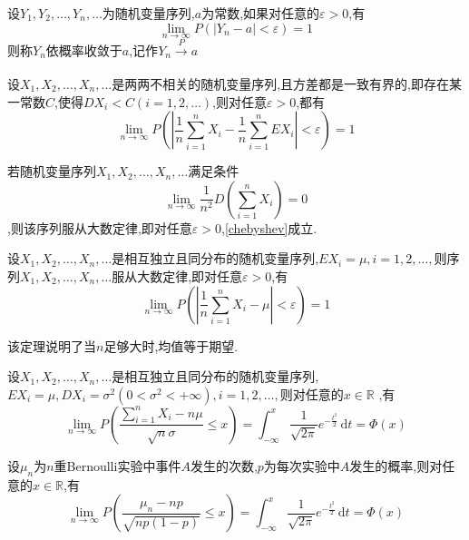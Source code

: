 \begin{definition}
    设$Y_1,Y_2,\dots,Y_n,\dots$为随机变量序列,$a$为常数,如果对任意的$\varepsilon >0$,有\[
     \lim_{n \to \infty}P(\left\lvert Y_n-a \right\rvert< \varepsilon )=1 \]则称${{Y_n}}$依概率收敛于$a$,记作$Y_n\xrightarrow[]{P} a$
\end{definition}
\begin{theorem}[Chebyshev大数定律]
    设$X_1,X_2,\dots,X_n,\dots$是两两不相关的随机变量序列,且方差都是一致有界的,即存在某一常数$C$,使得$DX_i<C(i=1,2,\dots)$,则对任意$\varepsilon >0$,都有
\begin{equation*}
    \label{chebyshev}
        \lim_{n \to \infty}P\left(\left\lvert \frac{1}{n}\sum^{n}_{i=1}X_i-\frac{1}{n}\sum^{n}_{i=1}EX_i \right\rvert< \varepsilon \right)=1
\end{equation*}
\end{theorem}
\begin{theorem}[Markov大数定律]
    若随机变量序列$X_1,X_2,\dots,X_n,\dots$满足条件\[\lim_{n \to \infty}\frac{1}{n^2}D\left(\sum^{n}_{i=1}X_i\right)=0\],则该序列服从大数定律,即对任意$\varepsilon >0$,\eqref{chebyshev}成立.
\end{theorem}
\begin{theorem}[Khinchin大数定律]
    设$X_1,X_2,\dots,X_n,\dots$是相互独立且同分布的随机变量序列,$EX_i=\mu,i=1,2,\dots,$则序列$X_1,X_2,\dots,X_n,\dots$服从大数定律,即对任意$\varepsilon >0$,有
\begin{equation*}
        \lim_{n \to \infty}P\left(\left\lvert \frac{1}{n}\sum^{n}_{i=1}X_i-\mu \right\rvert< \varepsilon \right)=1
\end{equation*}
\end{theorem}
该定理说明了当$n$足够大时,均值等于期望.

\begin{theorem}
    设$X_1,X_2,\dots,X_n,\dots$是相互独立且同分布的随机变量序列,$EX_i=\mu,DX_i=\sigma^2(0<\sigma^2<+\infty),i=1,2,\dots,$则对任意的$x\in \mathbb{R}$ ,有
\begin{equation*}
        \lim_{n \to \infty}P\left(\frac{\sum\limits^{n}_{i=1}X_i-n\mu}{\sqrt{n}\sigma} \leqslant x \right)=\int_{-\infty}^{x}\frac{1}{\sqrt{2\pi}}e^{-\frac{t^2}{2}}  \,\mathrm{d} t =\varPhi (x)
\end{equation*}
\end{theorem}
\begin{theorem}
    设$\mu_n$为$n$重Bernoulli实验中事件$A$发生的次数,$p$为每次实验中$A$发生的概率,则对任意的$x\in \mathbb{R}$,有
\begin{equation*}
        \lim_{n \to \infty}P\left(\frac{\mu_n-np}{\sqrt{np(1-p)}}\leqslant x \right)=\int_{-\infty}^{x}\frac{1}{\sqrt{2\pi}}e^{-\frac{t^2}{2}}  \,\mathrm{d} t =\varPhi (x)
\end{equation*}
\end{theorem}
